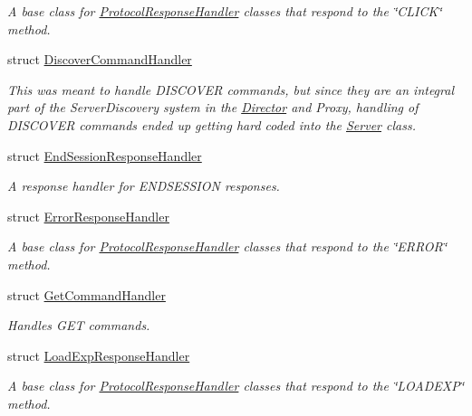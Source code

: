 \begin{DoxyCompactItemize}
\begin{DoxyCompactList}\small\item\em A base class for \hyperlink{struct_picto_1_1_protocol_response_handler}{Protocol\-Response\-Handler} classes that respond to the \char`\"{}\-C\-L\-I\-C\-K\char`\"{} method. \end{DoxyCompactList}\item 
struct \hyperlink{struct_picto_1_1_discover_command_handler}{Discover\-Command\-Handler}
\begin{DoxyCompactList}\small\item\em This was meant to handle D\-I\-S\-C\-O\-V\-E\-R commands, but since they are an integral part of the Server\-Discovery system in the \hyperlink{class_director}{Director} and Proxy, handling of D\-I\-S\-C\-O\-V\-E\-R commands ended up getting hard coded into the \hyperlink{class_server}{Server} class. \end{DoxyCompactList}\item 
struct \hyperlink{struct_picto_1_1_end_session_response_handler}{End\-Session\-Response\-Handler}
\begin{DoxyCompactList}\small\item\em A response handler for E\-N\-D\-S\-E\-S\-S\-I\-O\-N responses. \end{DoxyCompactList}\item 
struct \hyperlink{struct_picto_1_1_error_response_handler}{Error\-Response\-Handler}
\begin{DoxyCompactList}\small\item\em A base class for \hyperlink{struct_picto_1_1_protocol_response_handler}{Protocol\-Response\-Handler} classes that respond to the \char`\"{}\-E\-R\-R\-O\-R\char`\"{} method. \end{DoxyCompactList}\item 
struct \hyperlink{struct_picto_1_1_get_command_handler}{Get\-Command\-Handler}
\begin{DoxyCompactList}\small\item\em Handles G\-E\-T commands. \end{DoxyCompactList}\item 
struct \hyperlink{struct_picto_1_1_load_exp_response_handler}{Load\-Exp\-Response\-Handler}
\begin{DoxyCompactList}\small\item\em A base class for \hyperlink{struct_picto_1_1_protocol_response_handler}{Protocol\-Response\-Handler} classes that respond to the \char`\"{}\-L\-O\-A\-D\-E\-X\-P\char`\"{} method. \end{DoxyCompactList}\item 

\end{DoxyCompactItemize}
